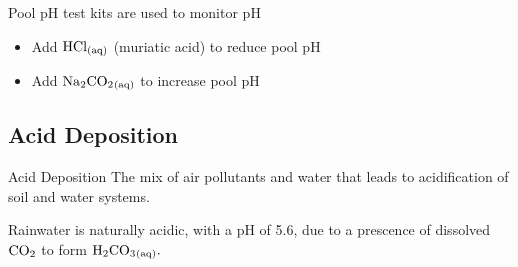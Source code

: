 \documentclass[12pt]{report}
\begin{document}
Pool pH test kits are used to monitor pH 
\begin{itemize}
    \item{Add $\ce{HCl_{(aq)}}$ (muriatic acid) to reduce pool pH}
    \item{Add $\ce{Na2CO2_{(aq)}}$ to increase pool pH}
\end{itemize}

\subsection{Acid Deposition}
\begin{definition}{Acid Deposition}
    The mix of air pollutants and water that leads to acidification of soil and water systems. 
\end{definition}

\begin{remark}{ } 
    Rainwater is naturally acidic, with a pH of 5.6, due to a prescence of dissolved $\ce{CO2}$ to form $\ce{H2CO3_{(aq)}}.$
\end{remark}
\end{document}
